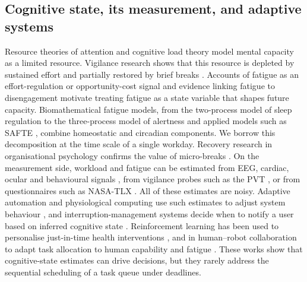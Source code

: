 \subsection{Cognitive state, its measurement, and adaptive systems}
Resource theories of attention \cite{kahneman1973,wickens2008} and cognitive load theory \cite{sweller1988} model mental capacity as a limited resource. Vigilance research shows that this resource is depleted by sustained effort \cite{mackworth1948,warm2008} and partially restored by brief breaks \cite{ariga2011}. Accounts of fatigue as an effort-regulation or opportunity-cost signal \cite{hockey2013,kurzban2013} and evidence linking fatigue to disengagement \cite{hopstaken2015} motivate treating fatigue as a state variable that shapes future capacity. Biomathematical fatigue models, from the two-process model of sleep regulation \cite{borbely1982,daan1984,borbely2016} to the three-process model of alertness \cite{akerstedt1997} and applied models such as SAFTE \cite{hursh2004}, combine homeostatic and circadian components. We borrow this decomposition at the time scale of a single workday. Recovery research in organisational psychology confirms the value of micro-breaks \cite{sonnentag2007,fritz2013,kim2017,albulescu2022}. On the measurement side, workload and fatigue can be estimated from EEG, cardiac, ocular and behavioural signals \cite{gevins2003,borghini2014,hogervorst2014,charles2019,shaffer2017}, from vigilance probes such as the PVT \cite{dinges1985,basner2011}, or from questionnaires such as NASA-TLX \cite{hart1988,young2015}. All of these estimates are noisy. Adaptive automation and physiological computing use such estimates to adjust system behaviour \cite{byrne1996,parasuraman2000,kaber2004,fairclough2009,zander2011,feigh2012}, and interruption-management systems decide when to notify a user based on inferred cognitive state \cite{horvitz2003,iqbal2008,czerwinski2004,mark2008}. Reinforcement learning has been used to personalise just-in-time health interventions \cite{klasnja2015,nahumshani2018,liao2020,yu2021}, and in human--robot collaboration to adapt task allocation to human capability and fatigue \cite{gombolay2015,peternel2018,ajoudani2018,lamon2019,zhang2022hrc}. These works show that cognitive-state estimates can drive decisions, but they rarely address the sequential scheduling of a task queue under deadlines.

